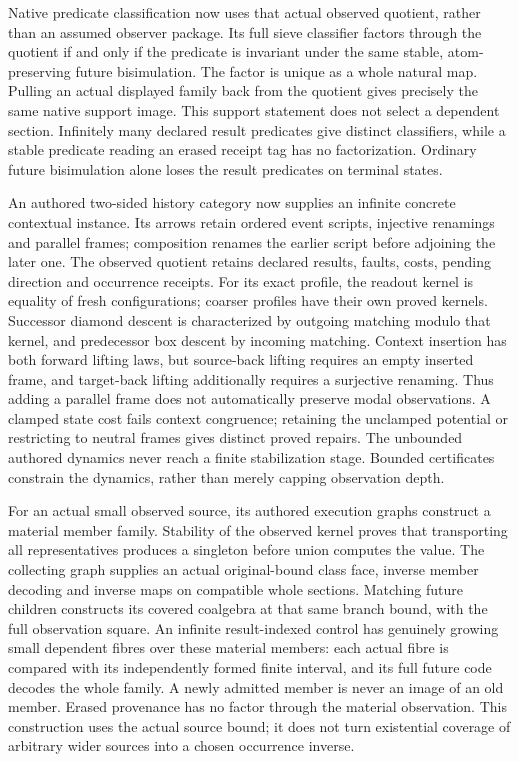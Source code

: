 \documentclass[11pt]{article}
\theoremstyle{definition}
\theoremstyle{remark}
\begin{document}
Native predicate classification now uses that actual observed quotient,
rather than an assumed observer package. Its full sieve classifier factors
through the quotient if and only if the predicate is invariant under the
same stable, atom-preserving future bisimulation. The factor is unique as a
whole natural map. Pulling an actual displayed family back from the quotient
gives precisely the same native support image. This support statement does
not select a dependent section. Infinitely many declared result predicates
give distinct classifiers, while a stable predicate reading an erased
receipt tag has no factorization. Ordinary future bisimulation alone loses
the result predicates on terminal states.

An authored two-sided history category now supplies an infinite concrete
contextual instance. Its arrows retain ordered event scripts, injective
renamings and parallel frames; composition renames the earlier script
before adjoining the later one. The observed quotient retains declared
results, faults, costs, pending direction and occurrence receipts. For its
exact profile, the readout kernel is equality of fresh configurations;
coarser profiles have their own proved kernels. Successor diamond descent
is characterized by outgoing matching modulo that kernel, and predecessor
box descent by incoming matching. Context insertion has both forward
lifting laws, but source-back lifting requires an empty inserted frame,
and target-back lifting additionally requires a surjective renaming.
Thus adding a parallel frame does not automatically preserve modal
observations. A clamped state cost fails context congruence; retaining the
unclamped potential or restricting to neutral frames gives distinct
proved repairs. The unbounded authored dynamics never reach a finite
stabilization stage. Bounded certificates constrain the dynamics,
rather than merely capping observation depth.

For an actual small observed source, its authored execution graphs
construct a material member family.  Stability of the observed kernel
proves that transporting all representatives produces a singleton before
union computes the value.  The collecting graph supplies an actual
original-bound class face, inverse member decoding and inverse maps on
compatible whole sections.  Matching future children constructs its
covered coalgebra at that same branch bound, with the full observation
square.  An infinite result-indexed control has genuinely growing small
dependent fibres over these material members: each actual fibre is
compared with its independently formed finite interval, and its full
future code decodes the whole family.  A newly admitted member is never
an image of an old member.  Erased provenance has no factor through the
material observation.  This construction uses the actual source bound;
it does not turn existential coverage of arbitrary wider sources into a
chosen occurrence inverse.
\end{document}
